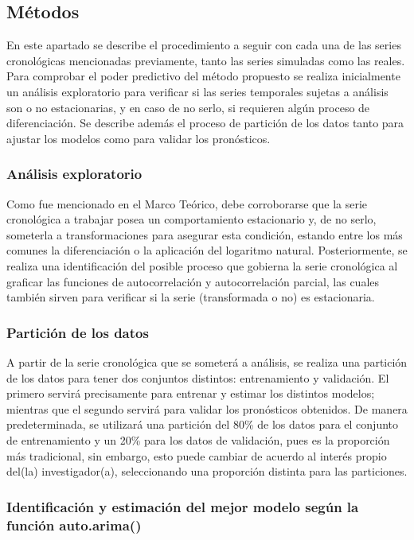 \documentclass[
]{article}
\begin{document}
\subsection{Métodos}

En este apartado se describe el procedimiento a seguir con cada una de
las series cronológicas mencionadas previamente, tanto las series
simuladas como las reales. Para comprobar el poder predictivo del método
propuesto se realiza inicialmente un análisis exploratorio para
verificar si las series temporales sujetas a análisis son o no
estacionarias, y en caso de no serlo, si requieren algún proceso de
diferenciación. Se describe además el proceso de partición de los datos
tanto para ajustar los modelos como para validar los pronósticos.

\subsubsection{Análisis exploratorio}

Como fue mencionado en el Marco Teórico, debe corroborarse que la serie
cronológica a trabajar posea un comportamiento estacionario y, de no
serlo, someterla a transformaciones para asegurar esta condición,
estando entre los más comunes la diferenciación o la aplicación del
logaritmo natural. Posteriormente, se realiza una identificación del
posible proceso que gobierna la serie cronológica al graficar las
funciones de autocorrelación y autocorrelación parcial, las cuales
también sirven para verificar si la serie (transformada o no) es
estacionaria.

\subsubsection{Partición de los datos}

A partir de la serie cronológica que se someterá a análisis, se realiza
una partición de los datos para tener dos conjuntos distintos:
entrenamiento y validación. El primero servirá precisamente para
entrenar y estimar los distintos modelos; mientras que el segundo
servirá para validar los pronósticos obtenidos. De manera
predeterminada, se utilizará una partición del 80\% de los datos para el
conjunto de entrenamiento y un 20\% para los datos de validación, pues
es la proporción más tradicional, sin embargo, esto puede cambiar de
acuerdo al interés propio del(la) investigador(a), seleccionando una
proporción distinta para las particiones.

\subsubsection{Identificación y estimación del mejor modelo según la función auto.arima()}
\end{document}
